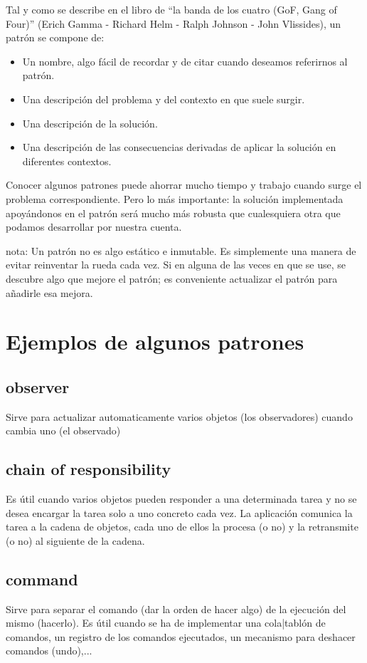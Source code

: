 \documentclass[spanish,12pt,a4paper,final,oneside]{book}
\begin{document}
Tal y como se describe en el libro de ``la banda de los cuatro (GoF, Gang of Four)'' (Erich Gamma - Richard Helm - Ralph Johnson - John Vlissides), un patrón se compone de:
\begin{itemize}
\item Un nombre, algo fácil de recordar y de citar cuando deseamos referirnos al patrón.
\item Una descripción del problema y del contexto en que suele surgir.
\item Una descripción de la solución.
\item Una descripción de las consecuencias derivadas de aplicar la solución en diferentes contextos.
\end{itemize}

Conocer algunos patrones puede ahorrar mucho tiempo y trabajo cuando surge el problema correspondiente. Pero lo más importante: la solución implementada apoyándonos en el patrón será mucho más robusta que cualesquiera otra que podamos desarrollar por nuestra cuenta.

nota: Un patrón no es algo estático e inmutable. Es simplemente una manera de evitar reinventar la rueda cada vez. Si en alguna de las veces en que se use, se descubre algo que mejore el patrón; es conveniente actualizar el patrón para añadirle esa mejora.

\section{Ejemplos de algunos patrones}
\subsection{observer}
Sirve para actualizar automaticamente varios objetos (los observadores)  cuando cambia uno (el observado)
\subsection{chain of responsibility}
Es útil cuando varios objetos pueden responder a una determinada tarea y no se desea encargar la tarea solo a uno concreto cada vez. La aplicación comunica la tarea a la cadena de objetos, cada uno de ellos la procesa (o no) y la retransmite (o no) al siguiente de la cadena.
\subsection{command}
Sirve para separar el comando (dar la orden de hacer algo) de la ejecución del mismo (hacerlo). Es útil cuando se ha de implementar una cola|tablón de comandos, un registro de los comandos ejecutados, un mecanismo para deshacer comandos (undo),...
\end{document}
